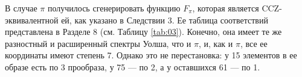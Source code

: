 В случае \(\pi\) получилось сгенерировать функцию \(F_\pi\), которая является CCZ-эквивалентной ей, как указано в Следствии 3. Ее таблица соответствий представлена в Разделе 8 (см. Таблицу \ref{tab:03}). Конечно, она имеет те же разностный и расширенный спектры Уолша, что и \(\pi\), и, как и \(\pi\), все ее координаты имеют степень 7. Однако это не перестановка: у 15 элементов в ее образе есть по 3 прообраза, у 75 — по 2, а у оставшихся 61 — по 1.